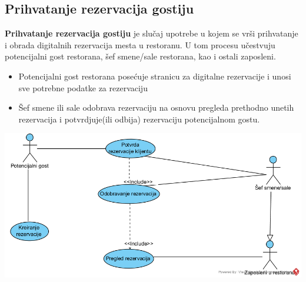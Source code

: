 \documentclass{article}
\begin{document}
\subsection{Prihvatanje rezervacija gostiju}
\textbf{Prihvatanje rezervacija gostiju} je slučaj upotrebe u kojem se vrši prihvatanje i obrada digitalnih rezervacija mesta u restoranu. U tom procesu učestvuju potencijalni gost restorana, šef smene/sale restorana, kao i ostali zaposleni.\\

\begin{itemize}
\item Potencijalni gost restorana posećuje stranicu za digitalne rezervacije i unosi sve potrebne podatke za rezervaciju
\item Šef smene ili sale odobrava rezervaciju na osnovu pregleda prethodno unetih rezervacija i potvrdjuje(ili odbija) rezervaciju potencijalnom gostu.
\end{itemize}
\vspace{1cm}
\includegraphics[width=\textwidth]{SU_5_prihvatanje_rezervacija.png}
\end{document}

